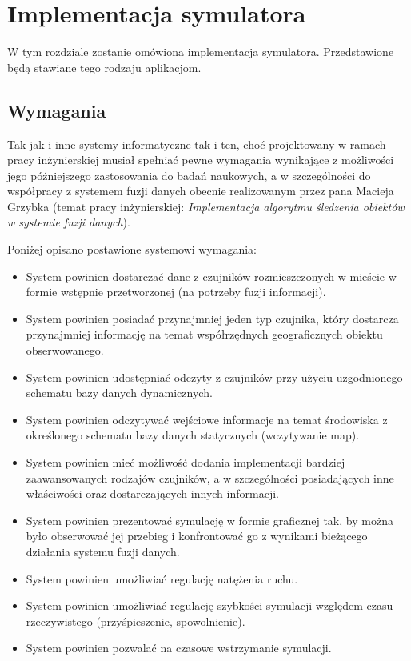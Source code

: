 \chapter{Implementacja symulatora}
\par{
W tym rozdziale zostanie omówiona implementacja symulatora. Przedstawione będą stawiane tego rodzaju aplikacjom.
}

\section[Wymagania][Wymagania]{Wymagania}

\par{
Tak jak i inne systemy informatyczne tak i ten, choć projektowany w ramach pracy inżynierskiej musiał spełniać pewne wymagania wynikające z możliwości jego późniejszego zastosowania do badań naukowych, a w szczególności do współpracy z systemem fuzji danych obecnie realizowanym przez pana Macieja Grzybka (temat pracy inżynierskiej: \textit{Implementacja algorytmu śledzenia obiektów w systemie fuzji danych}).
}
\par{
Poniżej opisano postawione systemowi wymagania:
\begin{itemize}
	\item System powinien dostarczać dane z czujników rozmieszczonych w mieście w formie wstępnie przetworzonej (na potrzeby fuzji informacji).
	\item System powinien posiadać przynajmniej jeden typ czujnika, który dostarcza przynajmniej informację na temat współrzędnych geograficznych obiektu obserwowanego.
	\item System powinien udostępniać odczyty z czujników przy użyciu uzgodnionego schematu bazy danych dynamicznych.
	\item System powinien odczytywać wejściowe informacje na temat środowiska z określonego schematu bazy danych statycznych (wczytywanie map).
	\item System powinien mieć możliwość dodania implementacji bardziej zaawansowanych rodzajów czujników, a w szczególności posiadających inne właściwości oraz dostarczających innych informacji.
	\item System powinien prezentować symulację w formie graficznej tak, by można było obserwować jej przebieg i konfrontować go z wynikami bieżącego działania systemu fuzji danych.
	\item System powinien umożliwiać regulację natężenia ruchu.
	\item System powinien umożliwiać regulację szybkości symulacji względem czasu rzeczywistego (przyśpieszenie, spowolnienie).
	\item System powinien pozwalać na czasowe wstrzymanie symulacji.
\end{itemize}
}

